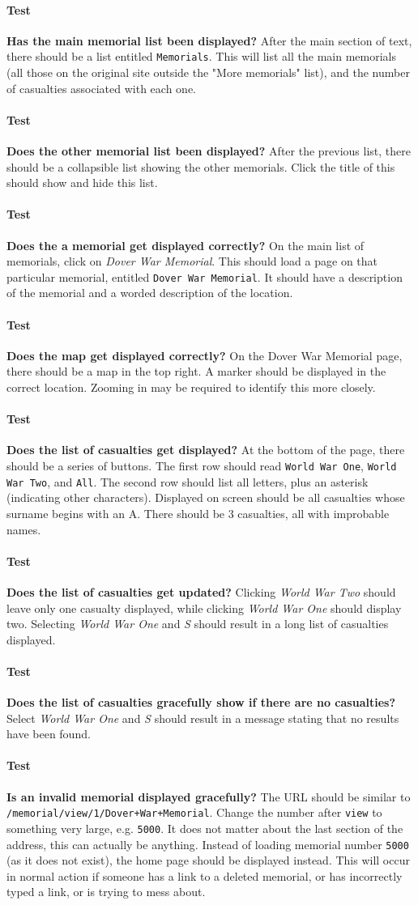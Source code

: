 \documentclass[12pt]{article}
\newcounter{Test}
\newcommand{\test}[1]{%
\stepcounter{Test}%
\paragraph{Test \theTest} \textbf{#1} }
\begin{document}
\test{Has the main memorial list been displayed?}
After the main section of text, there should be a list entitled \texttt{Memorials}. This will list all the main memorials (all those on the original site outside the "More memorials" list), and the number of casualties associated with each one.

\test{Does the other memorial list been displayed?}
After the previous list, there should be a collapsible list showing the other memorials. Click the title of this should show and hide this list.

\test{Does the a memorial get displayed correctly?}
On the main list of memorials, click on \textit{Dover War Memorial}. This should load a page on that particular memorial, entitled \texttt{Dover War Memorial}. It should have a description of the memorial and a worded description of the location.

\test{Does the map get displayed correctly?}
On the Dover War Memorial page, there should be a map in the top right. A marker should be displayed in the correct location. Zooming in may be required to identify this more closely.

\test{Does the list of casualties get displayed?}
At the bottom of the page, there should be a series of buttons. The first row should read \texttt{World War One}, \texttt{World War Two}, and \texttt{All}. The second row should list all letters, plus an asterisk (indicating other characters). Displayed on screen should be all casualties whose surname begins with an A. There should be 3 casualties, all with improbable names.

\test{Does the list of casualties get updated?}
Clicking \textit{World War Two} should leave only one casualty displayed, while clicking \textit{World War One} should display two. Selecting \textit{World War One} and \textit{S} should result in a long list of casualties displayed.

\test{Does the list of casualties gracefully show if there are no casualties?}
Select \textit{World War One} and \textit{S} should result in a message stating that no results have been found.

\test{Is an invalid memorial displayed gracefully?}
The URL should be similar to \texttt{/memorial/view/1/Dover+War+Memorial}. Change the number after \texttt{view} to something very large, e.g. \texttt{5000}. It does not matter about the last section of the address, this can actually be anything. Instead of loading memorial number \texttt{5000} (as it does not exist), the home page should be displayed instead. This will occur in normal action if someone has a link to a deleted memorial, or has incorrectly typed a link, or is trying to mess about.
\end{document}
